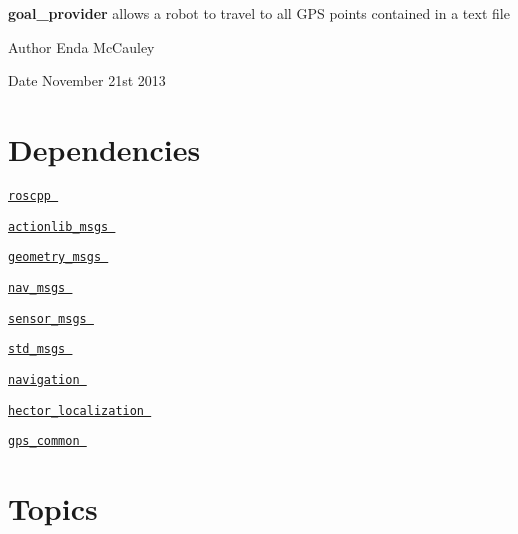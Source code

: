 {\bfseries goal\-\_\-provider} allows a robot to travel to all \-G\-P\-S points contained in a text file \par
 \par
 \begin{DoxyAuthor}{\-Author}
\-Enda \-Mc\-Cauley 
\end{DoxyAuthor}
\begin{DoxyDate}{\-Date}
\-November 21st 2013
\end{DoxyDate}
\hypertarget{index_dependencies}{}\section{\-Dependencies}\label{index_dependencies}

\begin{DoxyItemize}
\item {\ttfamily } \href{http://wiki.ros.org/roscpp}{\tt roscpp }
\item {\ttfamily } \href{http://wiki.ros.org/actionlib_msgs}{\tt actionlib\-\_\-msgs }
\item {\ttfamily } \href{http://wiki.ros.org/geometry_msgs}{\tt geometry\-\_\-msgs }
\item {\ttfamily } \href{http://wiki.ros.org/nav_msgs}{\tt nav\-\_\-msgs }
\item {\ttfamily } \href{http://wiki.ros.org/sensor_msgs}{\tt sensor\-\_\-msgs }
\item {\ttfamily } \href{http://wiki.ros.org/std_msgs}{\tt std\-\_\-msgs }
\item {\ttfamily } \href{http://http://wiki.ros.org/navigation?distro=hydro}{\tt navigation }
\item {\ttfamily } \href{http://wiki.ros.org/hector_localization}{\tt hector\-\_\-localization }
\item {\ttfamily } \href{http://wiki.ros.org/gps_common}{\tt gps\-\_\-common }
\end{DoxyItemize}\hypertarget{index_topics}{}\section{\-Topics}\label{index_topics}

